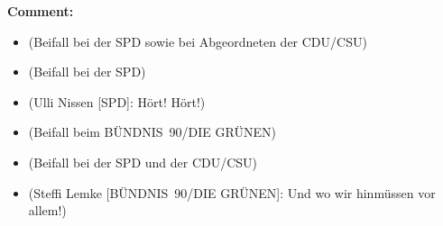 \documentclass{article}
\begin{document}
\noindent\textbf{Comment:}
\begin{itemize}
    \setlength\itemsep{-3pt}
    \item (Beifall bei der SPD sowie bei Abgeordneten der CDU/CSU)
    \setlength\itemsep{-3pt}
    \item (Beifall bei der SPD)
    \setlength\itemsep{-3pt}
    \item (Ulli Nissen [SPD]: Hört! Hört!)
    \setlength\itemsep{-3pt}
    \item (Beifall beim BÜNDNIS 90/DIE GRÜNEN)
    \setlength\itemsep{-3pt}
    \item (Beifall bei der SPD und der CDU/CSU)
    \setlength\itemsep{-3pt}
    \item (Steffi Lemke [BÜNDNIS 90/DIE GRÜNEN]: Und wo wir hinmüssen vor allem!)
\end{itemize}
\end{document}
